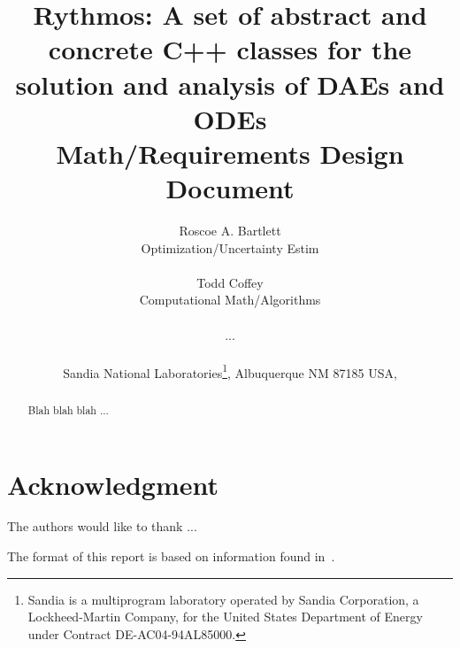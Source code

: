 \documentclass[pdf,ps2pdf,11pt]{SANDreport}
\title{
Rythmos: A set of abstract and concrete C++ classes for the solution and
analysis of DAEs and ODEs \\[2ex]
Math/Requirements Design Document
}
\author{
Roscoe A. Bartlett \\ Optimization/Uncertainty Estim \\ \\
Todd Coffey \\ Computational Math/Algorithms \\ \\
... \\ \\
Sandia National Laboratories\footnote{
Sandia is a multiprogram laboratory operated by Sandia Corporation, a
Lockheed-Martin Company, for the United States Department of Energy
under Contract DE-AC04-94AL85000.}, Albuquerque NM 87185 USA, \\
}
\date{}
\begin{document}
\raggedright

\maketitle

%

%
\begin{abstract}
%
Blah blah blah ...
%
\end{abstract}
%

%
\clearpage
\section*{Acknowledgment}
The authors would like to thank ...

The format of this report is based on information found
in~\cite{Sand98-0730}.

%
\clearpage
\tableofcontents
\listoffigures


\end{document}
